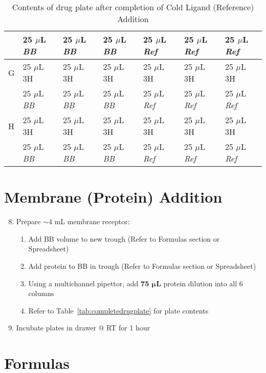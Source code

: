 \documentclass[12pt, letterpaper]{article}
\begin{document}
\begin{table}[h]
\begin{center}
\begin{tabular}{|l|lll|lll|}
        & 25 $\mu$L \emph{BB} & 25 $\mu$L \emph{BB} & 25 $\mu$L \emph{BB} & 25 $\mu$L \emph{Ref} & 25 $\mu$L \emph{Ref} & 25 $\mu$L \emph{Ref} \\ \hline
        G & 25 $\mu$L 3H        & 25 $\mu$L 3H        & 25 $\mu$L 3H        & 25 $\mu$L 3H         & 25 $\mu$L 3H         & 25 $\mu$L 3H         \\
        & 25 $\mu$L \emph{BB} & 25 $\mu$L \emph{BB} & 25 $\mu$L \emph{BB} & 25 $\mu$L \emph{Ref} & 25 $\mu$L \emph{Ref} & 25 $\mu$L \emph{Ref} \\ \hline
        H & 25 $\mu$L 3H        & 25 $\mu$L 3H        & 25 $\mu$L 3H        & 25 $\mu$L 3H         & 25 $\mu$L 3H         & 25 $\mu$L 3H         \\
        & 25 $\mu$L \emph{BB} & 25 $\mu$L \emph{BB} & 25 $\mu$L \emph{BB} & 25 $\mu$L \emph{Ref} & 25 $\mu$L \emph{Ref} & 25 $\mu$L \emph{Ref} \\ \hline
        \end{tabular}
    \caption{Contents of drug plate after completion of Cold Ligand (Reference) Addition}
    \end{center}
\end{table}


\section{Membrane (Protein) Addition}
\begin{enumerate}
    \setcounter{enumi}{7}
    \item Prepare $\sim$4 mL membrane receptor:
    \begin{enumerate}
        \item Add BB volume to new trough (Refer to Formulas section or Spreadsheet)
        \item Add protein to BB in trough (Refer to Formulas section or Spreadsheet)
        \item Using a multichannel pipettor, add \textbf{75 $\bm{\mu}$L} protein dilution into all 6 columns
        \item Refer to Table~\ref{tab:completedrugplate} for plate contents
    \end{enumerate}
    \item Incubate plates in drawer @ RT for 1 hour
\end{enumerate}



\section{Formulas}
\end{document}
